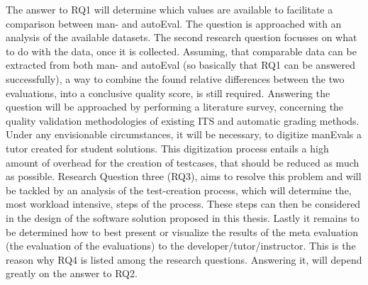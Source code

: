 The answer to RQ1 will determine which values are available to facilitate a comparison
between man- and autoEval. The question is approached with an analysis of the available
datasets.
The second research question focusses on what to do with the data, once it is collected.
Assuming, that comparable data can be extracted from both man- and autoEval (so basically
that RQ1 can be answered successfully), a way to combine the found relative differences
between the two evaluations, into a conclusive quality score, is still required.
Answering the question will be approached by performing a literature survey, concerning the
quality validation methodologies of existing ITS and automatic grading methods.
Under any envisionable circumstances, it will be necessary, to digitize manEvals a tutor
created for student solutions. This digitization process entails a high amount of overhead 
for the creation of testcases, that should be reduced as much as possible. Research Question
three (RQ3), aims to resolve this problem and will be tackled by an analysis of the test-creation
process, which will determine the, most workload intensive, steps of the process. These steps 
can then be considered in the design of the software solution proposed in this thesis.
Lastly it remains to be determined how to best present or visualize the results of the meta 
evaluation (the evaluation of the evaluations) to the developer/tutor/instructor.
This is the reason why RQ4 is listed among the research questions. Answering it, will depend
greatly on the answer to RQ2.
